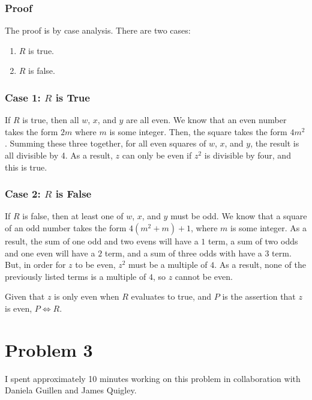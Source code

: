 \documentclass{article}
\begin{document}
\subsubsection*{Proof}

The proof is by case analysis. There are two cases:

\begin{enumerate}[\hspace{1cm}1.]
  \item $R$ is true.
  \item $R$ is false.
\end{enumerate}

\subsubsection*{Case 1: $R$ is True}

If $R$ is true, then all $w$, $x$, and $y$ are all even. We know that an even
number takes the form $2m$ where $m$ is some integer. Then, the square takes the
form $4m^{2}$. Summing these three together, for all even squares of $w$, $x$,
and $y$, the result is all divisible by 4. As a result, $z$ can only be even if
$z^{2}$ is divisible by four, and this is true.

\subsubsection*{Case 2: $R$ is False}

If $R$ is false, then at least one of $w$, $x$, and $y$ must be odd. We know
that a square of an odd number takes the form $4(m^{2} + m) + 1$, where $m$ is
some integer. As a result, the sum of one odd and two evens will have a $1$
term, a sum of two odds and one even will have a $2$ term, and a sum of three
odds with have a $3$ term. But, in order for $z$ to be even, $z^{2}$ must be a
multiple of $4$. As a result, none of the previously listed terms is a multiple
of $4$, so $z$ cannot be even.

\bigbreak

Given that $z$ is only even when $R$ evaluates to true, and $P$ is the assertion
that $z$ is even, $P \iff R$.

\section*{Problem 3}

I spent approximately 10 minutes working on this problem in collaboration with
Daniela Guillen and James Quigley.
\end{document}
